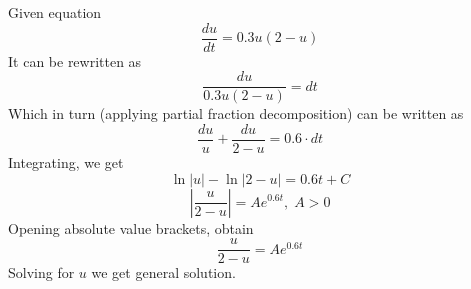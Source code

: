 \documentclass[8pt]{article} %
\newcommand{\myabs}[1]{\left|#1\right|}
\begin{document}
Given equation
\[\frac{du}{dt}=0.3u(2-u)\]
It can be rewritten as
\[\frac{du}{0.3u(2-u)}=dt\]
Which in turn (applying partial fraction decomposition) can be written as
\[\frac{du}{u}+\frac{du}{2-u}=0.6\cdot dt\]
Integrating, we get
\[\ln \myabs{u}-\ln \myabs{2-u}=0.6t+C\]
\[\myabs{\frac{u}{2-u}}=Ae^{0.6t},\; A>0\]
Opening absolute value brackets, obtain
\[\frac{u}{2-u}=Ae^{0.6t}\]
Solving for $u$ we get general solution.
\end{document}
